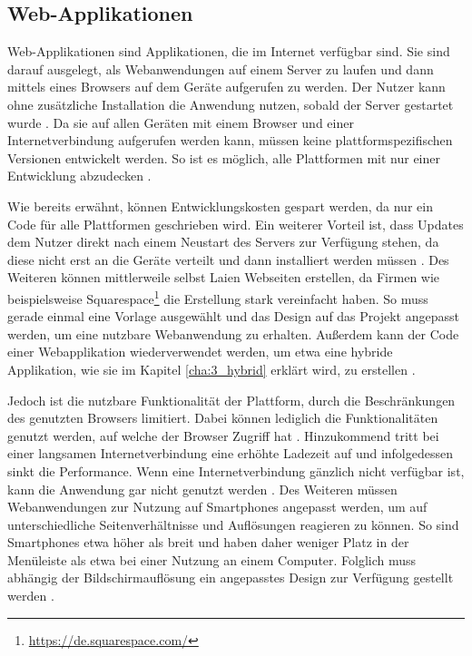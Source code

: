 \subsection{Web-Applikationen}
\label{cha:3_2_web}
Web-Applikationen sind Applikationen, die im Internet verfügbar sind. Sie sind darauf ausgelegt, als Webanwendungen auf einem Server zu laufen und dann mittels eines Browsers auf dem Geräte aufgerufen zu werden. Der Nutzer kann ohne zusätzliche Installation die Anwendung nutzen, sobald der Server gestartet wurde \cite{IEEE_Khackouch_Al}.
Da sie auf allen Geräten mit einem Browser und einer Internetverbindung aufgerufen werden kann, müssen keine plattformspezifischen Versionen entwickelt werden.
So ist es möglich, alle Plattformen mit nur einer Entwicklung abzudecken \cite{IEEE_development_classes}.

Wie bereits erwähnt, können Entwicklungskosten gespart werden, da nur ein Code für alle Plattformen geschrieben wird. Ein weiterer Vorteil ist, dass Updates dem Nutzer direkt nach einem Neustart des Servers zur Verfügung stehen, da diese nicht erst an die Geräte verteilt und dann installiert werden müssen \cite{IEEE_Khackouch_Al}. Des Weiteren können mittlerweile selbst Laien Webseiten erstellen, da Firmen wie beispielsweise Squarespace\footnote{\url{https://de.squarespace.com/}} die Erstellung stark vereinfacht haben. So muss gerade einmal eine Vorlage ausgewählt und das Design auf das Projekt angepasst werden, um eine nutzbare Webanwendung zu erhalten. 
Außerdem kann der Code einer Webapplikation wiederverwendet werden, um etwa eine hybride Applikation, wie sie im Kapitel \ref{cha:3_hybrid} erklärt wird, zu erstellen \cite{IEEE_Khackouch_Al}. 

Jedoch ist die nutzbare Funktionalität der Plattform, durch die Beschränkungen des genutzten Browsers limitiert. Dabei können lediglich die Funktionalitäten genutzt werden, auf welche der Browser Zugriff hat \cite{Phyo}. Hinzukommend tritt bei einer langsamen Internetverbindung eine erhöhte Ladezeit auf und infolgedessen sinkt die Performance. Wenn eine Internetverbindung gänzlich nicht verfügbar ist, kann die Anwendung gar nicht genutzt werden \cite{IEEE_Khackouch_Al}. Des Weiteren müssen Webanwendungen zur Nutzung auf Smartphones angepasst werden, um auf unterschiedliche Seitenverhältnisse und Auflösungen reagieren zu können. So sind Smartphones etwa höher als breit und haben daher weniger Platz in der Menüleiste als etwa bei einer Nutzung an einem Computer. Folglich muss abhängig der Bildschirmauflösung ein angepasstes Design zur Verfügung gestellt werden \cite{Serrano_mobile}.

